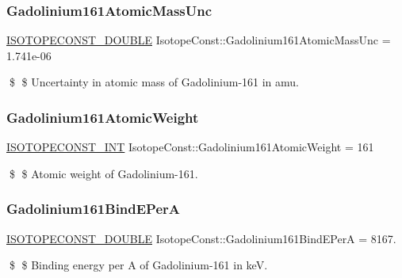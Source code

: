\subsubsection{\texorpdfstring{Gadolinium161\+Atomic\+Mass\+Unc}{Gadolinium161AtomicMassUnc}}
{\footnotesize\ttfamily \mbox{\hyperlink{group___isotope_const-_macros_ga8f45a7272ce02c0b4c65c44636ed719a}{I\+S\+O\+T\+O\+P\+E\+C\+O\+N\+S\+T\+\_\+\+D\+O\+U\+B\+LE}} Isotope\+Const\+::\+Gadolinium161\+Atomic\+Mass\+Unc = 1.\+741e-\/06}

\$ \$ Uncertainty in atomic mass of Gadolinium-\/161 in amu. \mbox{\label{group___isotope_const-_gadolinium-_gd161_gaf1b35cd513046eef80c6f1a1b223c747}} 
\subsubsection{\texorpdfstring{Gadolinium161\+Atomic\+Weight}{Gadolinium161AtomicWeight}}
{\footnotesize\ttfamily \mbox{\hyperlink{group___isotope_const-_macros_ga5f18360b3e99483a35c32d789e62621c}{I\+S\+O\+T\+O\+P\+E\+C\+O\+N\+S\+T\+\_\+\+I\+NT}} Isotope\+Const\+::\+Gadolinium161\+Atomic\+Weight = 161}

\$ \$ Atomic weight of Gadolinium-\/161. \mbox{\label{group___isotope_const-_gadolinium-_gd161_ga13ef09894971be97b52d458a14ae7154}} 
\subsubsection{\texorpdfstring{Gadolinium161\+Bind\+E\+PerA}{Gadolinium161BindEPerA}}
{\footnotesize\ttfamily \mbox{\hyperlink{group___isotope_const-_macros_ga8f45a7272ce02c0b4c65c44636ed719a}{I\+S\+O\+T\+O\+P\+E\+C\+O\+N\+S\+T\+\_\+\+D\+O\+U\+B\+LE}} Isotope\+Const\+::\+Gadolinium161\+Bind\+E\+PerA = 8167.}

\$ \$ Binding energy per A of Gadolinium-\/161 in keV. \mbox{\label{group___isotope_const-_gadolinium-_gd161_ga0f8811d6aaeea46109599962eb86faa8}} 
